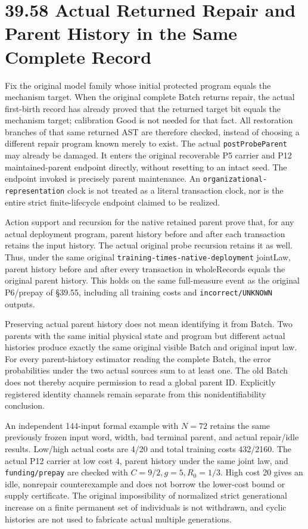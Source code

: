 \documentclass[
  english,
  11pt,
  oneside]{book}
\begin{document}
\section{39.58 Actual Returned Repair and Parent History in the Same Complete Record}\label{actual-returned-repair-and-parent-history-in-the-same-complete-record}

Fix the original model family whose initial protected program equals the mechanism target. When the original complete Batch returns repair, the actual first-birth record has already proved that the returned target bit equals the mechanism target; calibration Good is not needed for that fact. All restoration branches of that same returned AST are therefore checked, instead of choosing a different repair program known merely to exist. The actual \nolinkurl{postProbeParent} may already be damaged. It enters the original recoverable P5 carrier and P12 maintained-parent endpoint directly, without resetting to an intact seed. The endpoint invoked is precisely parent maintenance. An \nolinkurl{organizational-representation} clock is not treated as a literal transaction clock, nor is the entire strict finite-lifecycle endpoint claimed to be realized.

Action support and recursion for the native retained parent prove that, for any actual deployment program, parent history before and after each transaction retains the input history. The actual original probe recursion retains it as well. Thus, under the same original \nolinkurl{training-times-native-deployment} jointLaw, parent history before and after every transaction in wholeRecords equals the original parent history. This holds on the same full-measure event as the original P6/prepay of §39.55, including all training costs and \nolinkurl{incorrect/UNKNOWN} outputs.

Preserving actual parent history does not mean identifying it from Batch. Two parents with the same initial physical state and program but different actual histories produce exactly the same original visible Batch and original input law. For every parent-history estimator reading the complete Batch, the error probabilities under the two actual sources sum to at least one. The old Batch does not thereby acquire permission to read a global parent ID. Explicitly registered identity channels remain separate from this nonidentifiability conclusion.

An independent 144-input formal example with \(N=72\) retains the same previously frozen input word, width, bad terminal parent, and actual repair/idle results. Low/high actual costs are 4/20 and total training costs 432/2160. The actual P12 carrier at low cost 4, parent history under the same joint law, and \nolinkurl{funding/prepay} are checked with \(C=9/2,g=5,R_0=1/3\). High cost 20 gives an idle, nonrepair counterexample and does not borrow the lower-cost bound or supply certificate. The original impossibility of normalized strict generational increase on a finite permanent set of individuals is not withdrawn, and cyclic histories are not used to fabricate actual multiple generations.
\end{document}
